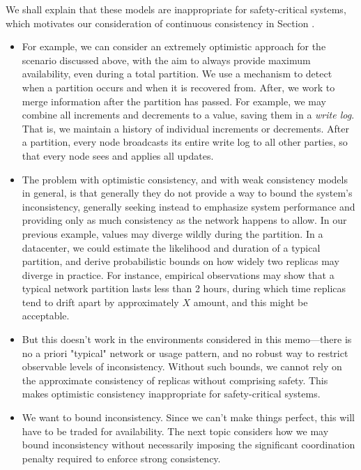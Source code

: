We shall explain that these models are inappropriate for
safety-critical systems, which motivates our consideration of
continuous consistency in Section \cite{}.

\begin{itemize}
  \item For example, we can consider an extremely optimistic approach for
  the scenario discussed above, with the aim to always provide maximum
  availability, even during a total partition. We use a mechanism to
  detect when a partition occurs and when it is recovered from. After,
  we work to merge information after the partition has passed. For
  example, we may combine all increments and decrements to a value,
  saving them in a \emph{write log}. That is, we maintain a history of
  individual increments or decrements. After a partition, every node
  broadcasts its entire write log to all other parties, so that every
  node sees and applies all updates.

  \item The problem with optimistic consistency, and with weak consistency
  models in general, is that generally they do not provide a way to
  bound the system's inconsistency, generally seeking instead to
  emphasize system performance and providing only as much consistency
  as the network happens to allow. In our previous example, values may
  diverge wildly during the partition. In a datacenter, we could
  estimate the likelihood and duration of a typical partition, and
  derive probabilistic bounds on how widely two replicas may diverge
  in practice. For instance, empirical observations may show that a
  typical network partition lasts less than 2 hours, during which time
  replicas tend to drift apart by approximately $X$ amount, and this
  might be acceptable.

  \item But this doesn't work in the environments considered in this
  memo---there is no a priori "typical" network or usage pattern, and
  no robust way to restrict observable levels of
  inconsistency. Without such bounds, we cannot rely on the
  approximate consistency of replicas without comprising safety. This
  makes optimistic consistency inappropriate for safety-critical
  systems.

  \item We want to bound inconsistency. Since we can't make things perfect,
  this will have to be traded for availability. The next topic
  considers how we may bound inconsistency without necessarily
  imposing the significant coordination penalty required to enforce
  strong consistency.

\end{itemize}

